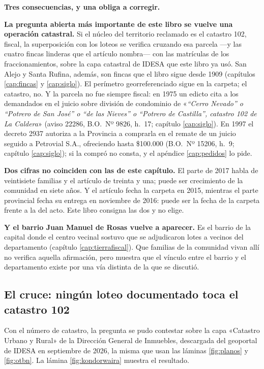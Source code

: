 \begin{cautela}
\textbf{Tres consecuencias, y una obliga a corregir.}

\textbf{La pregunta abierta más importante de este libro se vuelve una operación catastral.} Si el núcleo del territorio reclamado es el catastro 102, fiscal, la superposición con los loteos se verifica cruzando esa parcela ---y las cuatro fincas linderas que el artículo nombra--- con las matrículas de los fraccionamientos, sobre la capa catastral de IDESA que este libro ya usó. San Alejo y Santa Rufina, además, son fincas que el libro sigue desde 1909 (capítulos \ref{cap:fincas} y \ref{cap:siglo}). El perímetro georreferenciado sigue en la carpeta; el catastro, no. Y la parcela no fue siempre fiscal: en 1975 un edicto cita a los demandados en el juicio sobre división de condominio de «\textit{``Cerro Nevado'' o ``Potrero de San José'' o ``de las Nieves'' o ``Potrero de Castilla'', catastro 102 de La Caldera}» (aviso 22286, B.O.\ Nº 9826, h.\ 17; capítulo \ref{cap:siglo}). En 1997 el decreto 2937 autoriza a la Provincia a comprarla en el remate de un juicio seguido a Petrovial S.A., ofreciendo hasta \$100.000 (B.O.\ Nº 15206, h.\ 9; capítulo \ref{cap:siglo}); si la compró no consta, y el apéndice \ref{cap:pedidos} lo pide.

\textbf{Dos cifras no coinciden con las de este capítulo.} El parte de 2017 habla de veintisiete familias y el artículo de treinta y una; puede ser crecimiento de la comunidad en siete años. Y el artículo fecha la carpeta en 2015, mientras el parte provincial fecha su entrega en noviembre de 2016: puede ser la fecha de la carpeta frente a la del acto. Este libro consigna las dos y no elige.

\textbf{Y el barrio Juan Manuel de Rosas vuelve a aparecer.} Es el barrio de la capital donde el centro vecinal sostuvo que se adjudicaron lotes a vecinos del departamento (capítulo \ref{cap:tierrafiscal}). Que familias de la comunidad vivan allí no verifica aquella afirmación, pero muestra que el vínculo entre el barrio y el departamento existe por una vía distinta de la que se discutió.
\end{cautela}

\subsection*{El cruce: ningún loteo documentado toca el catastro 102}

Con el número de catastro, la pregunta se pudo contestar sobre la capa «Catastro Urbano y Rural» de la Dirección General de Inmuebles, descargada del geoportal de IDESA en septiembre de 2026, la misma que usan las láminas \ref{fig:planos} y \ref{fig:otbn}. La lámina \ref{fig:kondorwaira} muestra el resultado.

